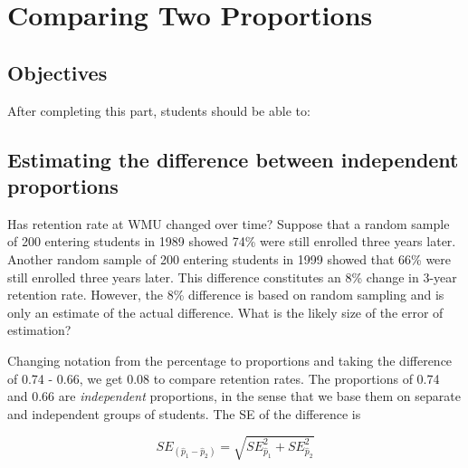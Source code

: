 \documentclass[11pt, chapterprefix=true]{scrbook}\usepackage[]{graphicx}\usepackage[]{color}
\begin{document}
\onecolumn



\chapter{Comparing Two Proportions }
\label{chap:ch9}

\section{Objectives}

After completing this part, students should be able to:


\section{Estimating the difference between independent proportions}

Has retention rate at WMU changed over time?  Suppose that a random sample of 200 entering students in 1989 showed 74\% were still enrolled three years later.  Another random sample of 200 entering students in 1999 showed that 66\% were still enrolled three years later.  This difference constitutes an 8\% change in 3-year retention rate.  However, the 8\% difference is based on random sampling and is only an estimate of the actual difference.  What is the likely size of the error of estimation?

Changing notation from the percentage to proportions and taking the difference of
0.74 - 0.66, we get 0.08 to compare retention rates.  The proportions of 0.74 and 0.66 are \textit{independent} proportions, in the sense that we base them on separate and independent groups of students.  The SE of the difference is

\begin{equation*}
  SE_{(\hat{p}_1 - \hat{p}_2)} = \sqrt{ SE_{\hat{p}_1}^2 + SE_{\hat{p}_2}^2}
\end{equation*}
\end{document}
